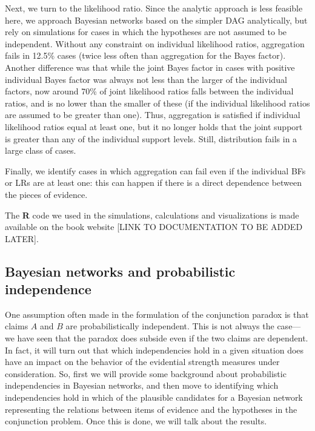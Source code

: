 \documentclass[
  10pt,
  dvipsnames,enabledeprecatedfontcommands]{scrartcl}
\begin{document}
Next, we turn to the likelihood ratio. Since the analytic approach is
less feasible here, we approach Bayesian networks based on the simpler
\textsf{DAG} analytically, but rely on simulations for cases in which
the hypotheses are not assumed to be independent. Without any constraint
on individual likelihood ratios, aggregation fails in 12.5\% cases
(twice less often than aggregation for the Bayes factor). Another
difference was that while the joint Bayes factor in cases with positive
individual Bayes factor was always not less than the larger of the
individual factors, now around 70\% of joint likelihood ratios falls
between the individual ratios, and is no lower than the smaller of these
(if the individual likelihood ratios are assumed to be greater than
one). Thus, aggregation is satisfied if individual likelihood ratios
equal at least one, but it no longer holds that the joint support is
greater than any of the individual support levels. Still, distribution
fails in a large class of cases.

Finally, we identify cases in which aggregation can fail even if the
individual BFs or LRs are at least one: this can happen if there is a
direct dependence between the pieces of evidence.

The \textsf{\textbf{R}} code we used in the simulations, calculations
and visualizations is made available on the book website {[}LINK TO
DOCUMENTATION TO BE ADDED LATER{]}.

\hypertarget{bayesian-networks-and-probabilistic-independence}{%
\subsection*{Bayesian networks and probabilistic
independence}\label{bayesian-networks-and-probabilistic-independence}}

One assumption often made in the formulation of the conjunction paradox
is that claims \(A\) and \(B\) are probabilistically independent. This
is not always the case---we have seen that the paradox does subside even
if the two claims are dependent. In fact, it will turn out that which
independencies hold in a given situation does have an impact on the
behavior of the evidential strength measures under consideration. So,
first we will provide some background about probabilistic independencies
in Bayesian networks, and then move to identifying which independencies
hold in which of the plausible candidates for a Bayesian network
representing the relations between items of evidence and the hypotheses
in the conjunction problem. Once this is done, we will talk about the
results.
\end{document}
